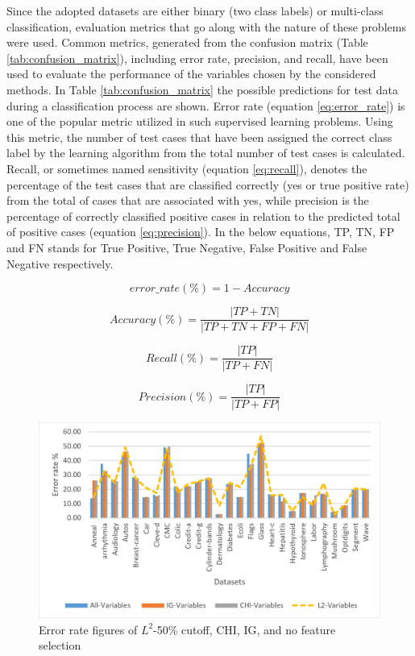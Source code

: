\documentclass[review]{elsarticle}
\begin{document}
Since the adopted datasets are either binary (two class labels) or multi-class classification, evaluation metrics that go along with the nature of these problems were used. Common metrics, generated from the confusion matrix (Table \ref{tab:confusion_matrix}), including error rate, precision, and recall, have been used to evaluate the performance of the variables chosen by the considered methods. In Table \ref{tab:confusion_matrix} the possible predictions for test data during a classification process are shown. Error rate (equation \ref{eq:error_rate}) is one of the popular metric utilized in such supervised learning problems. Using this metric, the number of test cases that have been assigned the correct class label by the learning algorithm from the total number of test cases is calculated. Recall, or sometimes named sensitivity  (equation \ref{eq:recall}), denotes the percentage of the test cases that are classified correctly (yes or true positive rate) from the total of cases that are associated with yes, while precision is the percentage of correctly classified positive cases in relation to the predicted total of positive cases (equation \ref{eq:precision}). In the below equations, TP, TN, FP and FN stands for True Positive, True Negative, False Positive and False Negative respectively. 

\begin{equation}\label{eq:error_rate}
error\_rate(\%) = 1- Accuracy
\end{equation}


\begin{equation}\label{eq:accuracy}
Accuracy(\%) = \frac{|TP + TN|}{|TP + TN + FP + FN|}
\end{equation}

\begin{equation}\label{eq:recall}
Recall(\%) = \frac{|TP|}{|TP + FN|} 
\end{equation}


\begin{equation}\label{eq:precision}
Precision(\%) = \frac{|TP|}{|TP + FP|} 
\end{equation}

\begin{figure}[h]
	\centering
	\includegraphics[width=0.8\linewidth]{figs/fig_4_error_rt_50.png}
	\caption[fig-4-error-rt-50]{Error rate figures of $ L^2 $-50\% cutoff, CHI, IG, and no feature selection }
	\label{fig:fig-4-error-rt-50}
\end{figure}
\end{document}

